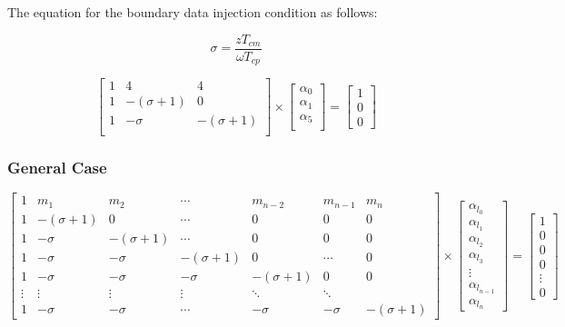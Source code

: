 The equation for the boundary data injection condition as follows:

$$\sigma = \frac{zT_{cm}}{\omega T_{cp}}$$

\begin{equation}
{
\left[ \begin{array}{ccc}
1 & 4 & 4 \\
1 & -(\sigma + 1) & 0\\
1 & -\sigma & -(\sigma + 1)\\
\end{array} 
\right ]} \times \left[ \begin{array}{c}
\alpha_{0} \\
\alpha_{1} \\
\alpha_{5} \\
\end{array} 
\right ] = \left[ \begin{array}{c}
1 \\
0 \\
0 
\end{array} 
\right ]
\end{equation}
\vspace*{50pt}


\subsubsection{General Case}
\begin{equation}
{
\left[ \begin{array}{ccccccc}
1 & m_{1} & m_{2} & \cdots & m_{n-2} & m_{n-1} & m_{n}\\
1 & -(\sigma + 1) & 0 & \cdots& 0 & 0 & 0\\
1 & -\sigma & -(\sigma + 1) & \cdots & 0 & 0 & 0 \\
1 & -\sigma & -\sigma & -(\sigma + 1) & 0 & \cdots & 0 \\
1 & -\sigma & -\sigma & -\sigma & -(\sigma + 1) & 0 & 0 \\
\vdots & \vdots & \vdots  &   \vdots & \ddots & \ddots\\
1 & -\sigma & -\sigma & \cdots & -\sigma & -\sigma & -(\sigma + 1)
\end{array} 
\right ]} \times \left[ \begin{array}{c}
\alpha_{l_{0}} \\
\alpha_{l_{1}} \\
\alpha_{l_{2}} \\
\alpha_{l_{3}} \\
\vdots \\
\alpha_{l_{n-1}}\\
\alpha_{l_{n}}
\end{array} 
\right ] = \left[ \begin{array}{c}
1 \\
0 \\
0 \\
0 \\
\vdots \\
0
\end{array} 
\right ]
\end{equation}